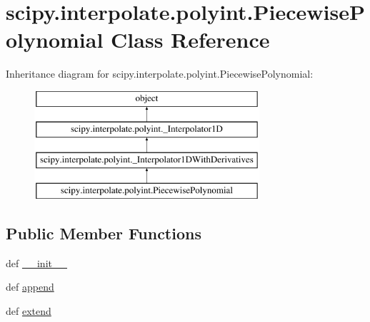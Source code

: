 \hypertarget{classscipy_1_1interpolate_1_1polyint_1_1PiecewisePolynomial}{}\section{scipy.\+interpolate.\+polyint.\+Piecewise\+Polynomial Class Reference}
\label{classscipy_1_1interpolate_1_1polyint_1_1PiecewisePolynomial}
Inheritance diagram for scipy.\+interpolate.\+polyint.\+Piecewise\+Polynomial\+:\begin{figure}[H]
\begin{center}
\leavevmode
\includegraphics[height=4.000000cm]{classscipy_1_1interpolate_1_1polyint_1_1PiecewisePolynomial}
\end{center}
\end{figure}
\subsection*{Public Member Functions}
\begin{DoxyCompactItemize}
\item 
def \hyperlink{classscipy_1_1interpolate_1_1polyint_1_1PiecewisePolynomial_a3ea5e7d29c3df1aae2b2dacffe61ca6d}{\+\_\+\+\_\+init\+\_\+\+\_\+}
\item 
def \hyperlink{classscipy_1_1interpolate_1_1polyint_1_1PiecewisePolynomial_a4be89fa771ebf2ee8addde8a0ee8bc0f}{append}
\item 
def \hyperlink{classscipy_1_1interpolate_1_1polyint_1_1PiecewisePolynomial_a6f677757d3eeada3e3dc7eea0dfcfb3f}{extend}
\end{DoxyCompactItemize}

